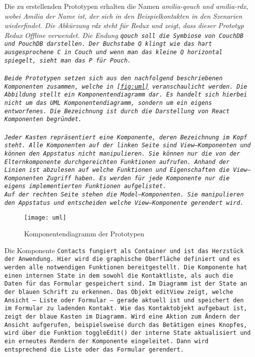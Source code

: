 Die zu erstellenden Prototypen erhalten die Namen \it{amilia-qouch} und \it{amilia-rdx}, wobei Amilia der Name ist, der sich in den Beispielkontakten in den Szenarien wiederfindet. Die Abkürzung \it{rdx} steht für Redux und zeigt, dass dieser Prototyp Redux Offline verwendet. Die Endung \tt{qouch} soll die Symbiose von CouchDB und PouchDB darstellen. Der Buchstabe Q klingt wie das hart ausgesprochene C in Couch und wenn man das kleine Q horizontal spiegelt, sieht man das P für Pouch.\\\\
Beide Prototypen setzen sich aus den nachfolgend beschriebenen Komponenten zusammen, welche in \autoref{fig:uml} veranschaulicht werden. Die Abbildung stellt ein Komponentendiagramm dar. Es handelt sich hierbei nicht um das UML Komponentendiagramm, sondern um ein eigens entworfenes. Die Bezeichnung ist durch die Darstellung von React Komponenten begründet.\\\\
%
%
Jeder Kasten repräsentiert eine Komponente, deren Bezeichnung im Kopf steht.
Alle Komponenten auf der linken Seite sind View--Komponenten und können den Appstatus nicht manipulieren. Sie können nur die von der Elternkomponente durchgereichten Funktionen aufrufen.
Anhand der Linien ist abzulesen auf welche Funktionen und Eigenschaften die View--Komponenten Zugriff haben. Es werden für jede Komponente nur die eigens implementierten Funktionen aufgelistet.\\
Auf der rechten Seite stehen die Model--Komponenten. Sie manipulieren den Appstatus und entscheiden welche View--Komponente gerendert wird.
%
\begin{figure}[ht]
  \centering
  \texttt{[image: uml]}
  \grayRule
  \caption[Komponentendiagramm]{Komponentendiagramm der Prototypen}
  \label{fig:uml}
\end{figure}
%
Die Komponente \tt{Contacts} fungiert als Container und ist das Herzstück der Anwendung.
Hier wird die graphische Oberfläche definiert und es werden alle notwendigen Funktionen bereitgestellt.
Die Komponente hat einen internen State in dem sowohl die Kontaktliste, als auch die Daten für das Formular gespeichert sind. Im Diagramm ist der State an der blauen Schrift zu erkennen.
Das Objekt \tt{editView} zeigt, welche Ansicht -- Liste oder Formular -- gerade aktuell ist und speichert den im Formular zu ladenden Kontakt.
Wie das Kontaktobjekt aufgebaut ist, zeigt der blaue Kasten im Diagramm.
Wird eine Aktion zum Ändern der Ansicht aufgerufen, beispielsweise durch das Betätigen eines Knopfes, wird über die Funktion \tt{toggleEdit()} der interne State aktualisiert und ein erneutes Rendern der Komponente eingeleitet. Dann wird entsprechend die Liste oder das Formular gerendert.\\
